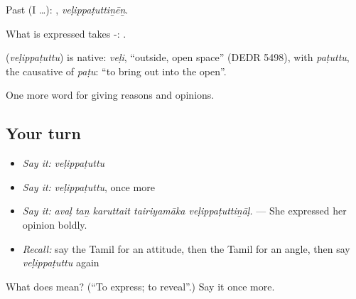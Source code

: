 Past (I …): , \emph{veḷippaṭuttiṉēṉ}.

What is expressed takes -:  .

\begin{cousinweb}
\textbf{} (\emph{veḷippaṭuttu}) is native: \emph{veḷi}, \textquotedblleft{}outside, open space\textquotedblright{} (DEDR 5498), with \emph{paṭuttu}, the causative of \emph{paṭu}: \textquotedblleft{}to bring out into the open\textquotedblright{}.
\end{cousinweb}

\begin{grammarlens}[title={What you've built}]
One more word for giving reasons and opinions.
\end{grammarlens}

\subsection*{Your turn}
\begin{itemize}
\raggedright
  \item \emph{Say it:} \emph{veḷippaṭuttu}
  \item \emph{Say it:} \emph{veḷippaṭuttu}, once more
  \item \emph{Say it:} \emph{avaḷ taṉ karuttait tairiyamāka veḷippaṭuttiṉāḷ.} — She expressed her opinion boldly.
  \item \emph{Recall:} say the Tamil for an attitude, then the Tamil for an angle, then say \emph{veḷippaṭuttu} again
\end{itemize}

\begin{tcolorbox}[breakable,colback=teal!4,colframe=teal!35!black,title={Before you move on}]
What does  mean? (\textquotedblleft{}To express; to reveal\textquotedblright{}.) Say it once more.
\end{tcolorbox}
